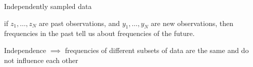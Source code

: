 \documentclass{beamer}
\begin{document}
 \begin{frame}{Independently sampled data}

    if $z_1,\ldots, z_N$ are past observations, and 
    $y_1,\ldots, y_N$ are new observations, then 
    frequencies in the past tell us about frequencies of the future. 


 \bigskip

 Independence $\implies$ frequencies of  different subsets of data are the same and do not influence each other
\end{frame}
\end{document}
